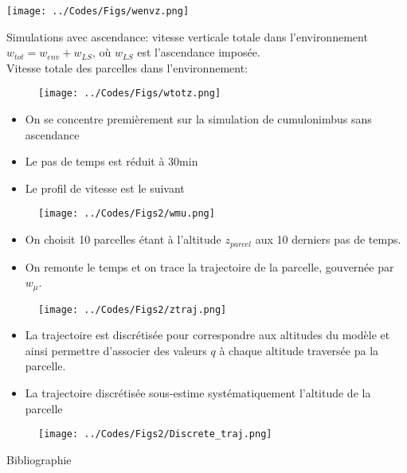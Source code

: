 \documentclass[10pt]{beamer}
\begin{document}
\begin{frame}{\secname}
    \centering
    \texttt{[image: ../Codes/Figs/wenvz.png]}
\end{frame}

\begin{frame}{\secname}
    Simulations avec ascendance: vitesse verticale totale dans l'environnement $w_{tot} = w_{env} + w_{LS}$, où $w_{LS}$ est l'ascendance imposée. \\
    Vitesse totale des parcelles dans l'environnement:
    
    \begin{figure}[hbtp]
        \centering
        \texttt{[image: ../Codes/Figs/wtotz.png]}
    \end{figure}
\end{frame}

\begin{frame}{\secname}
    \begin{itemize}
        \item On se concentre premièrement sur la simulation de cumulonimbus sans ascendance
        \item Le pas de temps est réduit à 30min
        \item Le profil de vitesse est le suivant
    \end{itemize}
    \begin{figure}[hbtp]
        \centering
        \texttt{[image: ../Codes/Figs2/wmu.png]}
    \end{figure}
\end{frame}

\begin{frame}{\secname}
    \begin{itemize}
        \item On choisit 10 parcelles étant à l'altitude $z_{parcel}$ aux 10 derniers pas de temps. 
        \item On remonte le temps et on trace la trajectoire de la parcelle, gouvernée par $w_{\mu}$.
    \end{itemize}
    \begin{figure}[hbtp]
        \centering
        \texttt{[image: ../Codes/Figs2/ztraj.png]}
    \end{figure}
\end{frame}

\begin{frame}{\secname}
    \begin{itemize}
        \item La trajectoire est discrétisée pour correspondre aux altitudes du modèle et ainsi permettre d'associer des valeurs $q$ à chaque altitude traversée pa la parcelle. 
        \item La trajectoire discrétisée sous-estime systématiquement l'altitude de la parcelle
    \end{itemize}
    \begin{figure}[hbtp]
        \centering
        \texttt{[image: ../Codes/Figs2/Discrete\_traj.png]}
    \end{figure}
\end{frame}

\begin{frame}{Bibliographie}
    \printbibliography
\end{frame}
\end{document}
